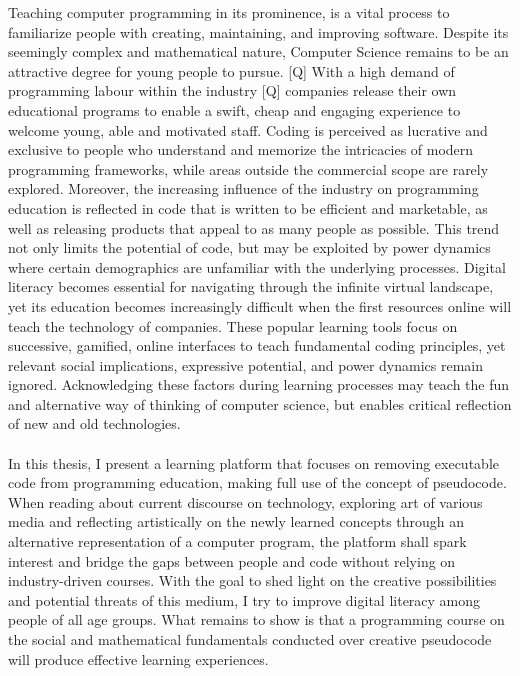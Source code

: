 Teaching computer programming in its prominence, is a vital process to familiarize people with creating, maintaining, and improving software. Despite its seemingly complex and mathematical nature, Computer Science remains to be an attractive degree for young people to pursue. [Q] With a high demand of programming labour within the industry [Q] companies release their own educational programs to enable a swift, cheap and engaging experience to welcome young, able and motivated staff. Coding is perceived as lucrative and exclusive to people who understand and memorize the intricacies of modern programming frameworks, while areas outside the commercial scope are rarely explored. Moreover, the increasing influence of the industry on programming education is reflected in code that is written to be efficient and marketable, as well as releasing products that appeal to as many people as possible. This trend not only limits the potential of code, but may be exploited by power dynamics where certain demographics are unfamiliar with the underlying processes. Digital literacy becomes essential for navigating through the infinite virtual landscape, yet its education becomes increasingly difficult when the first resources online will teach the technology of companies. These popular learning tools focus on successive, gamified, online interfaces to teach fundamental coding principles, yet relevant social implications, expressive potential, and power dynamics remain ignored. Acknowledging these factors during learning processes may teach the fun and alternative way of thinking of computer science, but enables critical reflection of new and old technologies. \\ \\
In this thesis, I present a learning platform that focuses on removing executable code from programming education, making full use of the concept of pseudocode. When reading about current discourse on technology, exploring art of various media and reflecting artistically on the newly learned concepts through an alternative representation of a computer program, the platform shall spark interest and bridge the gaps between people and code without relying on industry-driven courses. With the goal to shed light on the creative possibilities and potential threats of this medium, I try to improve digital literacy among people of all age groups. What remains to show is that a programming course on the social and mathematical fundamentals conducted over creative pseudocode will produce effective learning experiences. \\ \\
